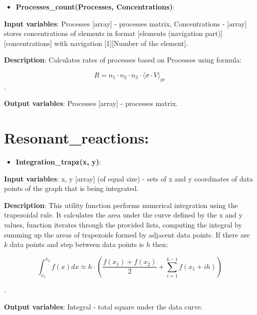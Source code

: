 \documentclass[a4paper,12pt]{article}
\newcommand{\namefunction}[4]{
  \begin{itemize}
    \item \textbf{#1}:
  \end{itemize}
  
  \textbf{Input variables}: #2.
  
  \textbf{Description}: #3.
  
  \textbf{Output variables}: #4.
}
\begin{document}
\namefunction{Processes\_count(Processes, Concentrations)}{Processes [array] - processes matrix, Concentrations - [array] stores concentrations of elements in format [elements (navigation part)][concentrations] with navigation [1][Number of the element]}{Calculates rates of processes based on Processes using formula:

\[R = n_1 \cdot n_2 \cdot n_3 \cdot \langle \sigma \cdot V \rangle_{gs}\]}{Processes [array] - processes matrix}

\section{Resonant\_reactions:}

\vspace{1em}

\namefunction{Integration\_trapz(x, y)}{x, y [array] (of equal size) - sets of x and y coordinates of data points of the graph that is being integrated}{This utility function performs numerical integration using the trapezoidal rule. It calculates the area under the curve defined by the x and y values, function iterates through the provided lists, computing the integral by summing up the areas of trapezoids formed by adjacent data points. If there are $k$ data points and step between data points is $h$ then:

\[\int_{x_1}^{x_2} f(x) dx \approx h \cdot \left( \frac{f(x_1) + f(x_2)}{2} + \sum_{i = 1}^{k - 1} f(x_1 + ih)\right)\]

}{Integral - total square under the data curve}

\vspace{1em}
\end{document}
